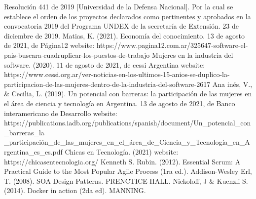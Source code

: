 \begin{thebibliography}{0}
    Resolución 441 de 2019 [Universidad de la Defensa Nacional]. Por la cual se establece el orden de los proyectos declarados como pertinentes y aprobados en la convocatoria 2019 del Programa UNDEX de la secretaría de Extensión. 23 de diciembre de 2019.
   Matias, K. (2021). Economía del conocimiento. 13 de agosto de 2021, de Página12 website: https://www.pagina12.com.ar/325647-software-el-pais-buscara-cuadruplicar-los-puestos-de-trabajo
   Mujeres en la industria del software. (2020). 11 de agosto de 2021, de cessi Argentina website: https://www.cessi.org.ar/ver-noticias-en-los-ultimos-15-anios-se-duplico-la-participacion-de-las-mujeres-dentro-de-la-industria-del-software-2617
   Ana inés, V., \& Cecilia, L. (2019). Un potencial con barreras: la participación de las mujeres en el área de ciencia y tecnología en Argentina. 13 de agosto de 2021, de Banco interamericano de Desarrollo website: https://publications.iadb.org/publications/spanish/document/Un\_potencial\_con\_barreras\_la
  \_participación\_de\_las\_mujeres\_en\_el\_área\_de\_Ciencia\_y\_Tecnología\_en\_Argentina\_es\_es.pdf 
   Chicas en Tecnología. (2021) website: https://chicasentecnologia.org/
   Kenneth S. Rubin. (2012). Essential Scrum: A Practical Guide to the Most Popular Agile Process (1ra ed.). Addison-Wesley
   Erl, T. (2008). SOA Design Patterns. PRENCTICE HALL.
   Nickoloff, J \& Kuenzli S. (2014). Docker in action (2da ed). MANNING.
\end{thebibliography}
